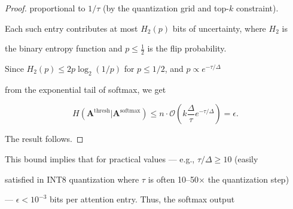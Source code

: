 \begin{proof}
proportional to $1/\tau$ (by the quantization grid and top-$k$ constraint).






Each such entry contributes at most $H_2(p)$ bits of uncertainty, where $H_2$ is






the binary entropy function and $p \leq \frac{1}{2}$ is the flip probability.






Since $H_2(p) \leq 2p\log_2(1/p)$ for $p \leq 1/2$, and $p \propto e^{-\tau/\Delta}$






from the exponential tail of softmax, we get






$$






H(\mathbf{A}^{\text{thresh}} | \mathbf{A}^{\text{softmax}}) \leq n \cdot \mathcal{O}\left(






k \frac{\Delta}{\tau} e^{-\tau / \Delta} \right) = \epsilon.






$$






The result follows.






\end{proof}













This bound implies that for practical values — e.g., $\tau / \Delta \geq 10$ (easily






satisfied in INT8 quantization where $\tau$ is often 10–50× the quantization step)






— $\epsilon < 10^{-3}$ bits per attention entry. Thus, the softmax output






